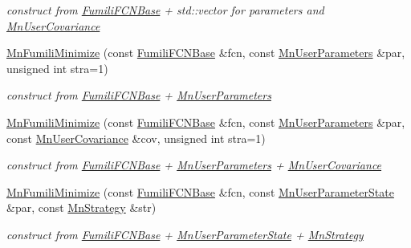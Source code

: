 \begin{DoxyCompactItemize}
\begin{DoxyCompactList}\small\item\em construct from \mbox{\hyperlink{classROOT_1_1Minuit2_1_1FumiliFCNBase}{Fumili\+F\+C\+N\+Base}} + std\+::vector for parameters and \mbox{\hyperlink{classROOT_1_1Minuit2_1_1MnUserCovariance}{Mn\+User\+Covariance}} \end{DoxyCompactList}\item 
\mbox{\hyperlink{classROOT_1_1Minuit2_1_1MnFumiliMinimize_aec4f0adff373393b4023f3a783b7d4bd}{Mn\+Fumili\+Minimize}} (const \mbox{\hyperlink{classROOT_1_1Minuit2_1_1FumiliFCNBase}{Fumili\+F\+C\+N\+Base}} \&fcn, const \mbox{\hyperlink{classROOT_1_1Minuit2_1_1MnUserParameters}{Mn\+User\+Parameters}} \&par, unsigned int stra=1)
\begin{DoxyCompactList}\small\item\em construct from \mbox{\hyperlink{classROOT_1_1Minuit2_1_1FumiliFCNBase}{Fumili\+F\+C\+N\+Base}} + \mbox{\hyperlink{classROOT_1_1Minuit2_1_1MnUserParameters}{Mn\+User\+Parameters}} \end{DoxyCompactList}\item 
\mbox{\hyperlink{classROOT_1_1Minuit2_1_1MnFumiliMinimize_a3dd4f225ca0cdfdc6eb542ee32667984}{Mn\+Fumili\+Minimize}} (const \mbox{\hyperlink{classROOT_1_1Minuit2_1_1FumiliFCNBase}{Fumili\+F\+C\+N\+Base}} \&fcn, const \mbox{\hyperlink{classROOT_1_1Minuit2_1_1MnUserParameters}{Mn\+User\+Parameters}} \&par, const \mbox{\hyperlink{classROOT_1_1Minuit2_1_1MnUserCovariance}{Mn\+User\+Covariance}} \&cov, unsigned int stra=1)
\begin{DoxyCompactList}\small\item\em construct from \mbox{\hyperlink{classROOT_1_1Minuit2_1_1FumiliFCNBase}{Fumili\+F\+C\+N\+Base}} + \mbox{\hyperlink{classROOT_1_1Minuit2_1_1MnUserParameters}{Mn\+User\+Parameters}} + \mbox{\hyperlink{classROOT_1_1Minuit2_1_1MnUserCovariance}{Mn\+User\+Covariance}} \end{DoxyCompactList}\item 
\mbox{\hyperlink{classROOT_1_1Minuit2_1_1MnFumiliMinimize_ad8292150eb4f2642fb583f0cec00ed7b}{Mn\+Fumili\+Minimize}} (const \mbox{\hyperlink{classROOT_1_1Minuit2_1_1FumiliFCNBase}{Fumili\+F\+C\+N\+Base}} \&fcn, const \mbox{\hyperlink{classROOT_1_1Minuit2_1_1MnUserParameterState}{Mn\+User\+Parameter\+State}} \&par, const \mbox{\hyperlink{classROOT_1_1Minuit2_1_1MnStrategy}{Mn\+Strategy}} \&str)
\begin{DoxyCompactList}\small\item\em construct from \mbox{\hyperlink{classROOT_1_1Minuit2_1_1FumiliFCNBase}{Fumili\+F\+C\+N\+Base}} + \mbox{\hyperlink{classROOT_1_1Minuit2_1_1MnUserParameterState}{Mn\+User\+Parameter\+State}} + \mbox{\hyperlink{classROOT_1_1Minuit2_1_1MnStrategy}{Mn\+Strategy}} \end{DoxyCompactList}\item 

\end{DoxyCompactItemize}
